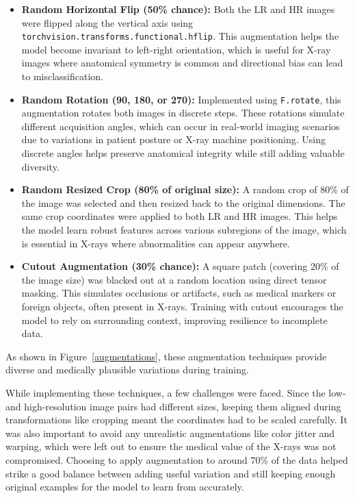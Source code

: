\documentclass{article} %
\begin{document}
\begin{itemize}
    \item \textbf{Random Horizontal Flip (50\% chance):} Both the LR and HR images were flipped along the vertical axis using \texttt{torchvision.transforms.functional.hflip}. This augmentation helps the model become invariant to left-right orientation, which is useful for X-ray images where anatomical symmetry is common and directional bias can lead to misclassification.

    \item \textbf{Random Rotation (90\degree, 180\degree, or 270\degree):} Implemented using \texttt{F.rotate}, this augmentation rotates both images in discrete steps. These rotations simulate different acquisition angles, which can occur in real-world imaging scenarios due to variations in patient posture or X-ray machine positioning. Using discrete angles helps preserve anatomical integrity while still adding valuable diversity.

    \item \textbf{Random Resized Crop (80\% of original size):} A random crop of 80\% of the image was selected and then resized back to the original dimensions. The same crop coordinates were applied to both LR and HR images. This helps the model learn robust features across various subregions of the image, which is essential in X-rays where abnormalities can appear anywhere.

    \item \textbf{Cutout Augmentation (30\% chance):} A square patch (covering 20\% of the image size) was blacked out at a random location using direct tensor masking. This simulates occlusions or artifacts, such as medical markers or foreign objects, often present in X-rays. Training with cutout encourages the model to rely on surrounding context, improving resilience to incomplete data.
\end{itemize}

As shown in Figure~\ref{augmentations}, these augmentation techniques provide diverse and medically plausible variations during training.

While implementing these techniques, a few challenges were faced. Since the low- and high-resolution image pairs had different sizes, keeping them aligned during transformations like cropping meant the coordinates had to be scaled carefully. It was also important to avoid any unrealistic augmentations like color jitter and warping, which were left out to ensure the medical value of the X-rays was not compromised. Choosing to apply augmentation to around 70\% of the data helped strike a good balance between adding useful variation and still keeping enough original examples for the model to learn from accurately.
\end{document}
